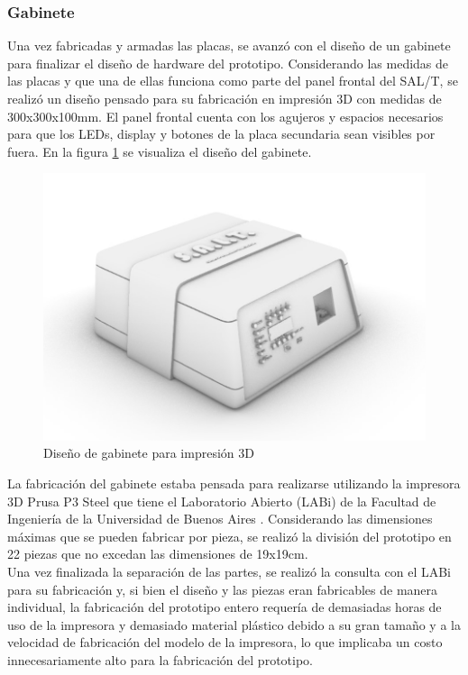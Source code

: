 \subsubsection{Gabinete}

Una vez fabricadas y armadas las placas, se avanzó con el diseño de un gabinete para finalizar el diseño de hardware del prototipo. Considerando las medidas de las placas y que una de ellas funciona como parte del panel frontal del SAL/T, se realizó un diseño pensado para su fabricación en impresión 3D con medidas de 300x300x100mm. El panel frontal cuenta con los agujeros y espacios necesarios para que los LEDs, display y botones de la placa secundaria sean visibles por fuera. En la figura \ref{fig:gabinete_3d} se visualiza el diseño del gabinete.   

\begin{figure}[H]
    \centering
    \includegraphics[width = \linewidth]{img/gabinete.jpeg}
    \caption{Diseño de gabinete para impresión 3D}
    \label{fig:gabinete_3d}
\end{figure}    

La fabricación del gabinete estaba pensada para realizarse utilizando la impresora 3D Prusa P3 Steel que tiene el Laboratorio Abierto (LABi) de la Facultad de Ingeniería de la Universidad de Buenos Aires \cite{labi_3d}. Considerando las dimensiones máximas que se pueden fabricar por pieza, se realizó la división del prototipo en 22 piezas que no excedan las dimensiones de 19x19cm. \\ 

Una vez finalizada la separación de las partes, se realizó la consulta con el LABi para su fabricación y, si bien el diseño y las piezas eran fabricables de manera individual, la fabricación del prototipo entero requería de demasiadas horas de uso de la impresora y demasiado material plástico debido a su gran tamaño y a la velocidad de fabricación del modelo de la impresora, lo que implicaba un costo innecesariamente alto para la fabricación del prototipo. \\ 

